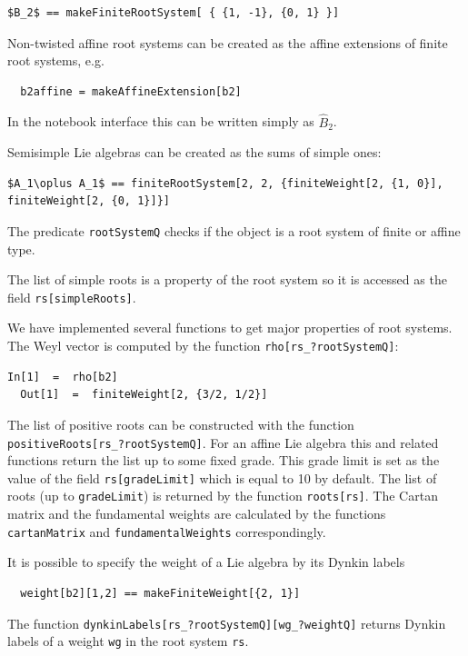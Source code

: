 \documentclass[preprint,12pt]{elsarticle}
\begin{document}
\begin{lstlisting}[mathescape=true]
  $B_2$ == makeFiniteRootSystem[ { {1, -1}, {0, 1} }]
\end{lstlisting}

Non-twisted affine root systems can be created as the affine extensions of finite root systems, e.g.
\begin{lstlisting}
  b2affine = makeAffineExtension[b2]
\end{lstlisting}
In the notebook interface this can be written simply as $\hat{B}_2$.

Semisimple Lie algebras can be created as the sums of simple ones:
\begin{lstlisting}[mathescape=true]
  $A_1\oplus A_1$ == finiteRootSystem[2, 2, {finiteWeight[2, {1, 0}], finiteWeight[2, {0, 1}]}]
\end{lstlisting}

The predicate \lstinline{rootSystemQ} checks if the object is a root system of finite or affine type.

The list of simple roots is a property of the root system so it is accessed as the field \lstinline{rs[simpleRoots]}.

We have implemented several functions to get major properties of root systems. The Weyl vector is computed by the function \lstinline{rho[rs_?rootSystemQ]}:
\begin{lstlisting}[label=list:1]
  In[1]  =  rho[b2]
  Out[1]  =  finiteWeight[2, {3/2, 1/2}]
\end{lstlisting}
The list of positive roots can be constructed with the function \lstinline{positiveRoots[rs_?rootSystemQ]}. For an affine Lie algebra this and related functions return the list up to some fixed grade. This grade limit is set as the value of the field \lstinline{rs[gradeLimit]} which is equal to 10 by default. The list of roots (up to \lstinline{gradeLimit}) is returned by the function \lstinline{roots[rs]}. The Cartan matrix and the fundamental weights are calculated by the functions \lstinline{cartanMatrix} and \lstinline{fundamentalWeights} correspondingly.

It is possible to specify the weight of a Lie algebra by its Dynkin labels
\begin{lstlisting}
  weight[b2][1,2] == makeFiniteWeight[{2, 1}]
\end{lstlisting}
The function \lstinline{dynkinLabels[rs_?rootSystemQ][wg_?weightQ]} returns Dynkin labels of a weight \lstinline{wg} in the root system \lstinline{rs}.
\end{document}
